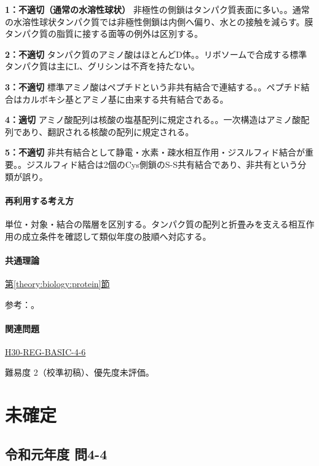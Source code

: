 \noindent\textbf{1：不適切（通常の水溶性球状）} 非極性の側鎖はタンパク質表面に多い。。通常の水溶性球状タンパク質では非極性側鎖は内側へ偏り、水との接触を減らす。膜タンパク質の脂質に接する面等の例外は区別する。\par

\noindent\textbf{2：不適切} タンパク質のアミノ酸はほとんどD体。。リボソームで合成する標準タンパク質は主にL、グリシンは不斉を持たない。\par

\noindent\textbf{3：不適切} 標準アミノ酸はペプチドという非共有結合で連結する。。ペプチド結合はカルボキシ基とアミノ基に由来する共有結合である。\par

\noindent\textbf{4：適切} アミノ酸配列は核酸の塩基配列に規定される。。一次構造はアミノ酸配列であり、翻訳される核酸の配列に規定される。\par

\noindent\textbf{5：不適切} 非共有結合として静電・水素・疎水相互作用・ジスルフィド結合が重要。。ジスルフィド結合は2個のCys側鎖のS-S共有結合であり、非共有という分類が誤り。\par

\paragraph{再利用する考え方} 単位・対象・結合の階層を区別する。タンパク質の配列と折畳みを支える相互作用の成立条件を確認して類似年度の肢順へ対応する。

\paragraph{共通理論} \hyperref[theory:biology:protein]{第\ref*{theory:biology:protein}節}

\par 参考：\cite{mit_protein}。

\paragraph{関連問題} \hyperref[q:h30-reg-basic-4-6]{H30-REG-BASIC-4-6}

\par 難易度 2（校準初稿）、優先度未評価。

\section{未確定}

\subsection{令和元年度 問4-4}
\label{q:r01-reg-basic-4-4}

